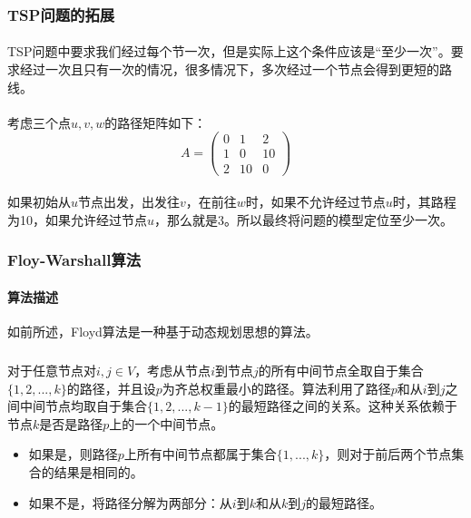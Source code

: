 \documentclass[UTF8,a4paper]{ctexart}
\begin{document}
\subsubsection{TSP问题的拓展}\label{sec:tspEXT}
\paragraph{}TSP问题中要求我们经过每个节一次，但是实际上这个条件应该是“至少一次”。要求经过一次且只有一次的情况，很多情况下，多次经过一个节点会得到更短的路线。
\paragraph{}考虑三个点$u,v,w$的路径矩阵如下：
\[
    A=\begin{pmatrix}
        0 & 1  & 2  \\
        1 & 0  & 10 \\
        2 & 10 & 0
    \end{pmatrix}
\]
\paragraph{}如果初始从$u$节点出发，出发往$v$，在前往$w$时，如果不允许经过节点$u$时，其路程为10，如果允许经过节点$u$，那么就是3。所以最终将问题的模型定位至少一次。

\subsubsection{Floy-Warshall算法}\label{sec:floydsolution}
\paragraph{算法描述}如前所述，Floyd算法是一种基于动态规划思想的算法。
\subparagraph{}对于任意节点对$i,j\in V$，考虑从节点$i$到节点$j$的所有中间节点全取自于集合$\{1,2,...,k\}$的路径，并且设$p$为齐总权重最小的路径。算法利用了路径$p$和从$i$到$j$之间中间节点均取自于集合$\{1,2,...,k-1\}$的最短路径之间的关系。这种关系依赖于节点$k$是否是路径$p$上的一个中间节点。
\begin{itemize}
    \item 如果是，则路径$p$上所有中间节点都属于集合$\{1,...,k\}$，则对于前后两个节点集合的结果是相同的。
    \item 如果不是，将路径分解为两部分：从$i$到$k$和从$k$到$j$的最短路径。
\end{itemize}
\end{document}
